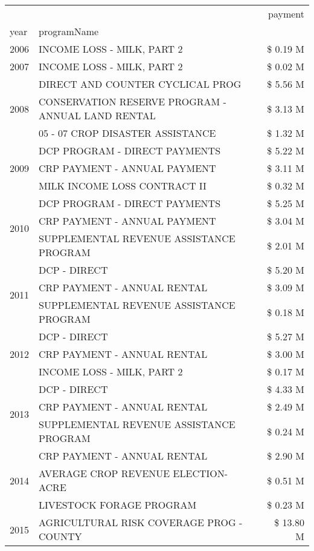 \begin{tabular}{llr}
\toprule
 &  & payment \\
year & programName &  \\
\midrule
2006 & INCOME LOSS - MILK, PART 2 & \$ 0.19 M \\
\cline{1-3}
2007 & INCOME LOSS - MILK, PART 2 & \$ 0.02 M \\
\cline{1-3}
\multirow[t]{3}{*}{2008} & DIRECT AND COUNTER CYCLICAL PROG & \$ 5.56 M \\
 & CONSERVATION RESERVE PROGRAM - ANNUAL LAND RENTAL & \$ 3.13 M \\
 & 05 - 07 CROP DISASTER ASSISTANCE & \$ 1.32 M \\
\cline{1-3}
\multirow[t]{3}{*}{2009} & DCP PROGRAM - DIRECT PAYMENTS & \$ 5.22 M \\
 & CRP PAYMENT - ANNUAL PAYMENT & \$ 3.11 M \\
 & MILK INCOME LOSS CONTRACT II & \$ 0.32 M \\
\cline{1-3}
\multirow[t]{3}{*}{2010} & DCP PROGRAM - DIRECT PAYMENTS & \$ 5.25 M \\
 & CRP PAYMENT - ANNUAL PAYMENT & \$ 3.04 M \\
 & SUPPLEMENTAL REVENUE ASSISTANCE PROGRAM & \$ 2.01 M \\
\cline{1-3}
\multirow[t]{3}{*}{2011} & DCP - DIRECT & \$ 5.20 M \\
 & CRP PAYMENT - ANNUAL RENTAL & \$ 3.09 M \\
 & SUPPLEMENTAL REVENUE ASSISTANCE PROGRAM & \$ 0.18 M \\
\cline{1-3}
\multirow[t]{3}{*}{2012} & DCP - DIRECT & \$ 5.27 M \\
 & CRP PAYMENT - ANNUAL RENTAL & \$ 3.00 M \\
 & INCOME LOSS - MILK, PART 2 & \$ 0.17 M \\
\cline{1-3}
\multirow[t]{3}{*}{2013} & DCP - DIRECT & \$ 4.33 M \\
 & CRP PAYMENT - ANNUAL RENTAL & \$ 2.49 M \\
 & SUPPLEMENTAL REVENUE ASSISTANCE PROGRAM & \$ 0.24 M \\
\cline{1-3}
\multirow[t]{3}{*}{2014} & CRP PAYMENT - ANNUAL RENTAL & \$ 2.90 M \\
 & AVERAGE CROP REVENUE ELECTION-ACRE & \$ 0.51 M \\
 & LIVESTOCK FORAGE PROGRAM & \$ 0.23 M \\
\cline{1-3}
\multirow[t]{3}{*}{2015} & AGRICULTURAL RISK COVERAGE PROG - COUNTY & \$ 13.80 M \\

\end{tabular}
